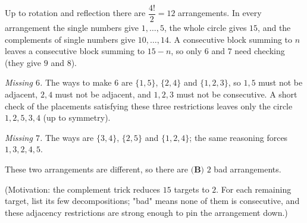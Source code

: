 Up to rotation and reflection there are $\dfrac{4!}{2}=12$ arrangements. In every arrangement the single numbers give $1,\dots,5$, the whole circle gives $15$, and the complements of single numbers give $10,\dots,14$. A consecutive block summing to $n$ leaves a consecutive block summing to $15-n$, so only $6$ and $7$ need checking (they give $9$ and $8$).

\emph{Missing $6$.} The ways to make $6$ are $\{1,5\}$, $\{2,4\}$ and $\{1,2,3\}$, so $1,5$ must not be adjacent, $2,4$ must not be adjacent, and $1,2,3$ must not be consecutive. A short check of the placements satisfying these three restrictions leaves only the circle $1,2,5,3,4$ (up to symmetry).

\emph{Missing $7$.} The ways are $\{3,4\}$, $\{2,5\}$ and $\{1,2,4\}$; the same reasoning forces $1,3,2,4,5$.

These two arrangements are different, so there are $\boxed{\textbf{(B) }2}$ bad arrangements.

(Motivation: the complement trick reduces $15$ targets to $2$. For each remaining target, list its few decompositions; "bad" means none of them is consecutive, and these adjacency restrictions are strong enough to pin the arrangement down.)
